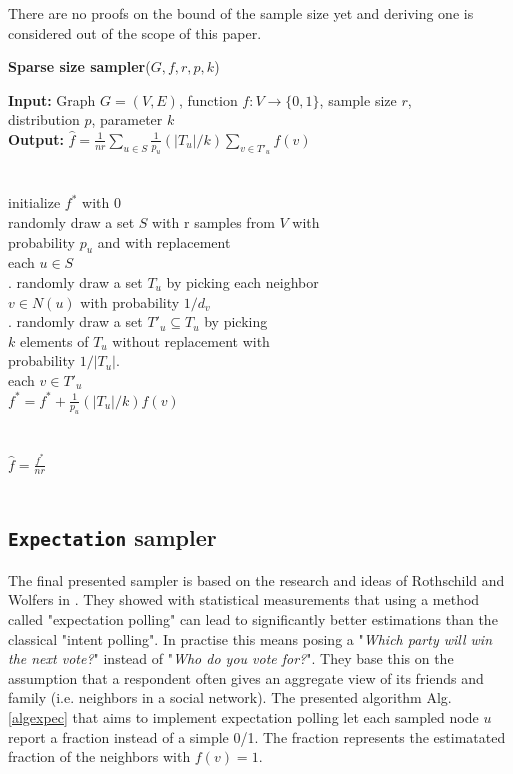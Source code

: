 There are no proofs on the bound of the sample size yet and deriving one is considered out of the scope of this paper.
\begin{algorithm*}[!htb]
\caption{\small {\bf Sparse size sampler}($G, f, r, p, k$)}
\begin{code}
{\bf Input:} Graph $G=(V,E)$, function $f : V \rightarrow \{0,1\}$, sample size $r$,\\ distribution $p$, parameter $k$ \\
{\bf Output:} $\hat{f}=\frac{1}{nr}\sum\nolimits_{u\in S}\frac{1}{p_u}(|T_u|/k)\sum\nolimits_{v\in T'_u} f(v)$\\
\\
\uln \>\ubegin\\
\uln \>\>initialize $f^*$ with 0 \\
\uln \>\>randomly draw a set $S$ with r samples from $V$ with\\
\>   \>\>probability $p_u$ and with replacement\\
\uln \>\>\ufor each $u \in S$ \udo\\
\uln \>\>. randomly draw a set $T_u$ by picking each neighbor\\
\>   \>\>\> $v \in N(u)$ with probability $1/d_v$ \\
\uln \>\>. randomly draw a set $T'_u \subseteq T_u$ by picking\\
\>   \>\>\> $k$ elements of $T_u$ without replacement with\\
\>   \>\>\> probability $1/|T_u|$.\\
\uln \>\>\>\ufor each $v \in T'_u$ \udo\\
\uln \>\>\>\>$f^* = f^* + \frac{1}{p_u}(|T_u|/k)f(v)$ \\
\uln \>\>\>\uend\\
\uln \>\>\uend\\
\uln \>\ureturn $\hat{f} = \frac{f^*}{nr}$ \\
\uln \>\uend\\ 
\end{code}
\label{algsparse}
\end{algorithm*}
\subsection{\texttt{Expectation} sampler}
The final presented sampler is based on the research and ideas of Rothschild and Wolfers in \cite{rothschild2009forecasting}. They showed with statistical measurements that using a method called "expectation polling" can lead to significantly better estimations than the classical "intent polling".
In practise this means posing a "\textit{Which party will win the next vote?}" instead of "\textit{Who do you vote for?}".
They base this on the assumption that a respondent often gives an aggregate view of its friends and family (i.e. neighbors in a social network).
The presented algorithm Alg. \ref{algexpec} that aims to implement expectation polling let each sampled node $u$ report a fraction instead of a simple 0/1. The fraction represents the estimatated fraction of the neighbors with $f(v) = 1$.

